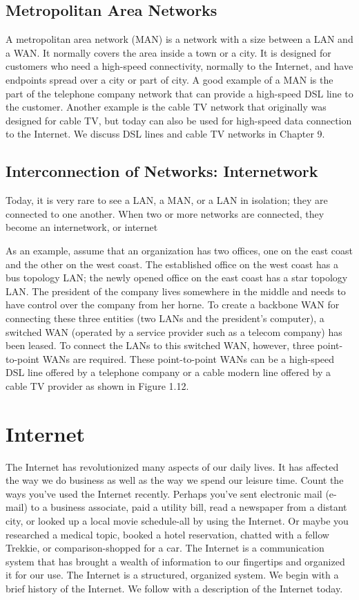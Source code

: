 \subsection*{Metropolitan Area Networks}
A metropolitan area network (MAN) is a network with a size between a LAN and a WAN. It normally covers the area inside a town or a city. It is designed for customers who need a high-speed connectivity, normally to the Internet, and have endpoints spread over a city or part of city. A good example of a MAN is the part of the telephone company network that can provide a high-speed DSL line to the customer. Another example is the cable TV network that originally was designed for cable TV, but today can also be used for high-speed data connection to the Internet. We discuss DSL lines and cable TV networks in Chapter 9.

\subsection{Interconnection of Networks: Internetwork}
Today, it is very rare to see a LAN, a MAN, or a LAN in isolation; they are connected to one another. When two or more networks are connected, they become an internetwork, or internet

As an example, assume that an organization has two offices, one on the east coast and the other on the west coast. The established office on the west coast has a bus topology LAN; the newly opened office on the east coast has a star topology LAN. The president of the company lives somewhere in the middle and needs to have control over the company from her horne. To create a backbone WAN for connecting these three entities (two LANs and the president's computer), a switched WAN (operated by a service provider such as a telecom company) has been leased. To connect the LANs to this switched WAN, however, three point-to-point WANs are required. These point-to-point WANs can be a high-speed DSL line offered by a telephone company or a cable modern line offered by a cable TV provider as shown in Figure 1.12.

\section{Internet}
The Internet has revolutionized many aspects of our daily lives. It has affected the way we do business as well as the way we spend our leisure time. Count the ways you've used the Internet recently. Perhaps you've sent electronic mail (e-mail) to a business associate, paid a utility bill, read a newspaper from a distant city, or looked up a local movie schedule-all by using the Internet. Or maybe you researched a medical topic, booked a hotel reservation, chatted with a fellow Trekkie, or comparison-shopped for a car. The Internet is a communication system that has brought a wealth of information to our fingertips and organized it for our use. The Internet is a structured, organized system. We begin with a brief history of the Internet. We follow with a description of the Internet today.

